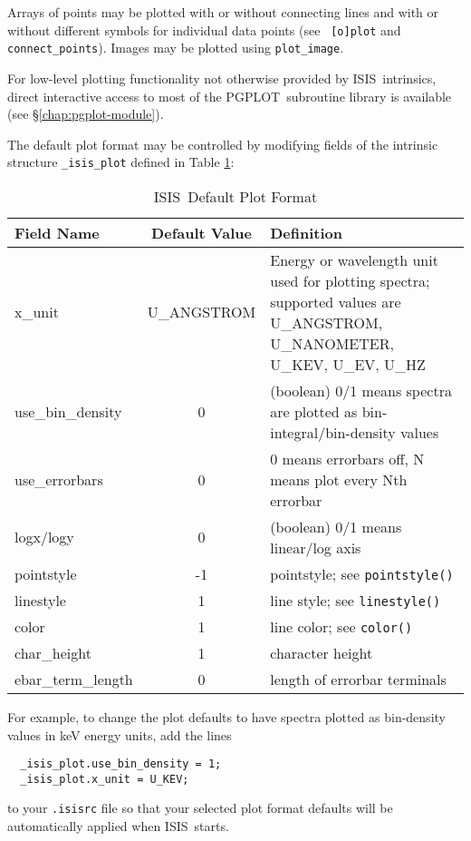 \documentclass{book}
\newcommand{\isisx}{{\sc ISIS~}}
\newcommand{\pgplot}{{\sc PGPLOT}}
\begin{document}
{Arrays of points may be plotted with or without connecting lines and
with or without different symbols for individual data points (see {\tt
[o]plot} and {\tt connect\_points}).  Images may be plotted using
\verb|plot_image|.

For low-level plotting functionality not otherwise provided by
\isisx intrinsics, direct interactive access to most of the \pgplot\
subroutine library is available (see \S\ref{chap:pgplot-module}).

The default plot format may be controlled by modifying fields
of the intrinsic structure {\tt \_isis\_plot} defined in
Table \ref{defaultplot-tbl}:
\begin{table}[ht] \caption{\isisx Default Plot Format}
\label{defaultplot-tbl}
\begin{tabular}{|l|c|p{3in}|}
\hline
Field Name & Default Value & Definition \\
\hline
 x\_unit & {\sc U\_ANGSTROM} & Energy or wavelength unit used for plotting spectra;
 supported values are {\sc U\_ANGSTROM}, {\sc U\_NANOMETER},
 {\sc U\_KEV}, {\sc U\_EV}, {\sc U\_HZ} \\
 use\_bin\_density & 0 & (boolean) 0/1 means spectra are plotted
 as bin-integral/bin-density values \\
 use\_errorbars & 0 & 0 means errorbars off, N means plot every Nth errorbar\\
 logx/logy    & 0 & (boolean) 0/1 means linear/log axis \\
 pointstyle   & -1 & pointstyle; see {\tt pointstyle()} \\
 linestyle    & 1 & line style; see {\tt linestyle()} \\
 color        & 1 & line color; see {\tt color()} \\
 char\_height & 1 & character height \\
 ebar\_term\_length & 0 & length of errorbar terminals \\
 \hline
\end{tabular}
\end{table}
For example, to change the plot defaults to have spectra plotted as
bin-density values in keV energy units, add the lines
\begin{verbatim}
  _isis_plot.use_bin_density = 1;
  _isis_plot.x_unit = U_KEV;
\end{verbatim}
to your \verb|.isisrc| file so that your selected plot format defaults
will be automatically applied when \isisx starts.

}
\end{document}
